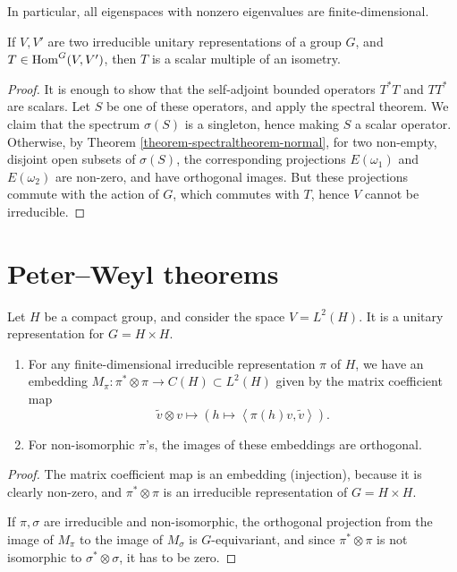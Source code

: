 In particular, all eigenspaces with nonzero eigenvalues are finite-dimensional.


\begin{theorem}
\label{theorem-Schurslemma}
 If $V, V'$ are two irreducible unitary representations of a group $G$, and $T \in \mathop{\rm Hom}\nolimits^G(V,V')$, then $T$ is a scalar multiple of an isometry.
\end{theorem}

\begin{proof}
 It is enough to show that the self-adjoint bounded operators $T^* T$ and $T T^*$ are scalars. Let $S$ be one of these operators, and apply the spectral theorem. We claim that the spectrum $\sigma(S)$ is a singleton, hence making $S$ a scalar operator. Otherwise, by Theorem \ref{theorem-spectraltheorem-normal}, for two non-empty, disjoint open subsets of $\sigma(S)$, the corresponding projections $E(\omega_1)$ and $E(\omega_2)$ are non-zero, and have orthogonal images. But these projections commute with the action of $G$, which commutes with $T$, hence $V$ cannot be irreducible.
\end{proof}



\section{Peter--Weyl theorems} \label{PeterWeyl}
\label{section-PeterWeyl}

Let $H$ be a compact group, and consider the space $V=L^2(H)$. It is a unitary representation for $G=H\times H$. 

\begin{lemma}
\label{lemma-matrixcoefficient}
\begin{enumerate}
  \item For any finite-dimensional irreducible representation $\pi$ of $H$, we have an embedding $M_\pi: \pi^*\otimes\pi\to C(H) \subset L^2(H)$ given by the matrix coefficient map
  $$ \tilde v\otimes v \mapsto (h\mapsto \left< \pi(h) v, \tilde v\right>).$$
  \item For non-isomorphic $\pi$'s, the images of these embeddings are orthogonal.
 \end{enumerate}
\end{lemma}

\begin{proof}
 The matrix coefficient map is an embedding (injection), because it is clearly non-zero, and $\pi^*\otimes\pi$ is an irreducible representation of $G=H\times H$.
 
 If $\pi, \sigma$ are irreducible and non-isomorphic, the orthogonal projection from the image of $M_\pi$ to the image of $M_\sigma$ is $G$-equivariant, and since $\pi^*\otimes \pi$ is not isomorphic to $\sigma^*\otimes \sigma$, it has to be zero.
\end{proof}



